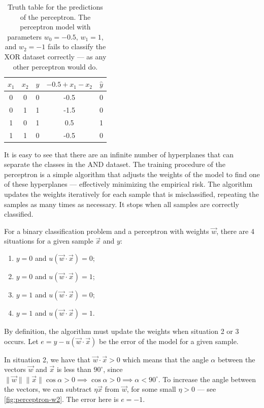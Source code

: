 \begin{table}
  \centering
  \begin{tabular}{ccc|cc}
    \toprule
    $x_1$ & $x_2$ & $y$ & $-0.5 + x_1 - x_2$ & $\hat{y}$ \\
    \midrule
    0 & 0 & 0 & -0.5 & 0 \\
    0 & 1 & 1 & -1.5 & 0 \\
    1 & 0 & 1 & 0.5 & 1 \\
    1 & 1 & 0 & -0.5 & 0 \\
    \bottomrule
  \end{tabular}
  \caption{
  Truth table for the predictions of the perceptron.
  The perceptron model with parameters $w_0 = -0.5$, $w_1 = 1$, and $w_2 = -1$
  fails to classify the XOR dataset correctly --- as any other perceptron would do.
  }
  \label{tab:xor-perceptron}
\end{table}

It is easy to see that there are an infinite number of hyperplanes that can separate the
classes in the AND dataset.  The training procedure of the perceptron is a simple
algorithm that adjusts the weights of the model to find one of these hyperplanes ---
effectively minimizing the empirical risk.  The algorithm updates the weights iteratively
for each sample that is misclassified, repeating the samples as many times as necessary.
It stops when all samples are correctly classified.

For a binary classification problem and a perceptron with weights $\vec{w}$, there are 4
situations for a given sample $\vec{x}$ and $y$:
\begin{enumerate}
  \itemsep0em
  \item $y = 0$ and $u(\vec{w} \cdot \vec{x})= 0$;
  \item $y = 0$ and $u(\vec{w} \cdot \vec{x})= 1$;
  \item $y = 1$ and $u(\vec{w} \cdot \vec{x})= 0$;
  \item $y = 1$ and $u(\vec{w} \cdot \vec{x})= 1$.
\end{enumerate}

By definition, the algorithm must update the weights when situation 2 or 3 occurs.
Let $e = y - u(\vec{w} \cdot \vec{x})$ be the error of the model for a given sample.

In situation 2, we have that $\vec{w} \cdot \vec{x} > 0$ which means that the angle
$\alpha$ between the vectors $\vec{w}$ and $\vec{x}$ is less than $90^\circ$, since
$\|\vec{w}\|\|\vec{x}\|\cos\alpha > 0 \implies \cos\alpha > 0 \implies \alpha <
90^\circ$.  To increase the angle between the vectors, we can subtract $\eta\vec{x}$ from
$\vec{w}$, for some small $\eta > 0$ --- see \cref{fig:perceptron-w2}.  The error
here is $e = -1$.

